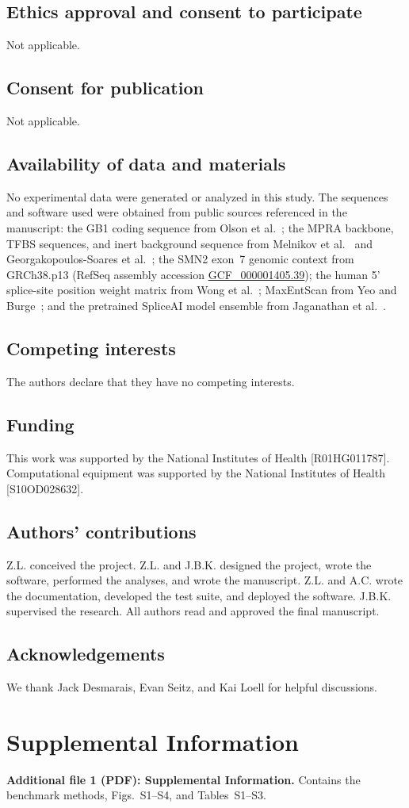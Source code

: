\documentclass[pdflatex,sn-vancouver-num,referee,oneside]{sn-jnl}
\begin{document}
\subsection*{Ethics approval and consent to participate}
Not applicable.

\subsection*{Consent for publication}
Not applicable.

\subsection*{Availability of data and materials}
No experimental data were generated or analyzed in this study. The sequences and software used were obtained from public sources referenced in the manuscript: the GB1 coding sequence from Olson et al.~\citep{Olson2014iq}; the MPRA backbone, TFBS sequences, and inert background sequence from Melnikov et al.~\citep{Melnikov2012dw} and Georgakopoulos-Soares et al.~\citep{GeorgakopoulosSoares2023tf}; the SMN2 exon~7 genomic context from GRCh38.p13 (RefSeq assembly accession \href{https://www.ncbi.nlm.nih.gov/datasets/genome/GCF_000001405.39/}{GCF\_000001405.39}); the human 5' splice-site position weight matrix from Wong et al.~\citep{Wong2018quantitative}; MaxEntScan from Yeo and Burge~\citep{Yeo2004me}; and the pretrained SpliceAI model ensemble from Jaganathan et al.~\citep{Jaganathan2019ps}.

\subsection*{Competing interests}
The authors declare that they have no competing interests.

\subsection*{Funding}
This work was supported by the National Institutes of Health [R01HG011787]. Computational equipment was supported by the National Institutes of Health [S10OD028632].

\subsection*{Authors' contributions}
Z.L. conceived the project. Z.L. and J.B.K. designed the project, wrote the software, performed the analyses, and wrote the manuscript. Z.L. and A.C. wrote the documentation, developed the test suite, and deployed the software. J.B.K. supervised the research. All authors read and approved the final manuscript.

\subsection*{Acknowledgements}
We thank Jack Desmarais, Evan Seitz, and Kai Loell for helpful discussions.

\section*{Supplemental Information}

\textbf{Additional file 1 (PDF): Supplemental Information.}
Contains the benchmark methods, Figs.~S1--S4, and Tables~S1--S3.


\end{document}
